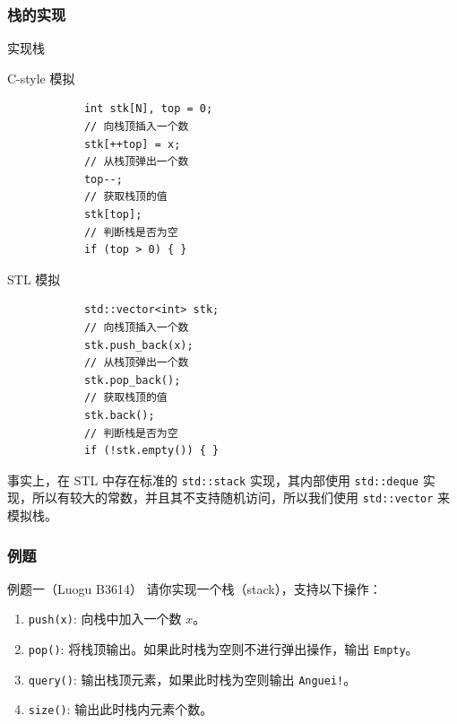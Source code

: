 \documentclass{beamer}
\begin{document}
\subsubsection{栈的实现}
\begin{frame}[fragile]{实现栈}
    \begin{minipage}[t]{0.4\linewidth}
        C-style 模拟
        \begin{verbatim}
            int stk[N], top = 0;
            // 向栈顶插入一个数
            stk[++top] = x;
            // 从栈顶弹出一个数
            top--;
            // 获取栈顶的值
            stk[top];
            // 判断栈是否为空
            if (top > 0) { }
        \end{verbatim}
    \end{minipage}
    \hspace{1cm}
    \begin{minipage}[t]{0.4\linewidth}
        STL 模拟
        \begin{verbatim}
            std::vector<int> stk;
            // 向栈顶插入一个数
            stk.push_back(x);
            // 从栈顶弹出一个数
            stk.pop_back();
            // 获取栈顶的值
            stk.back();
            // 判断栈是否为空
            if (!stk.empty()) { }
        \end{verbatim}
    \end{minipage}
\end{frame}

\begin{frame}
    事实上，在 STL 中存在标准的 \texttt{std::stack} 实现，其内部使用 \texttt{std::deque} 实现，所以有较大的常数，并且其不支持随机访问，所以我们使用 \texttt{std::vector} 来模拟栈。
\end{frame}

\subsubsection{例题}
\begin{frame}{例题一（Luogu B3614）}
    请你实现一个栈（stack），支持以下操作：
    \begin{enumerate}
        \item \texttt{push(x)}: 向栈中加入一个数 $x$。
        \item \texttt{pop()}: 将栈顶输出。如果此时栈为空则不进行弹出操作，输出 \texttt{Empty}。
        \item \texttt{query()}: 输出栈顶元素，如果此时栈为空则输出 \texttt{Anguei!}。
        \item \texttt{size()}: 输出此时栈内元素个数。
    \end{enumerate}
\end{frame}
\end{document}
